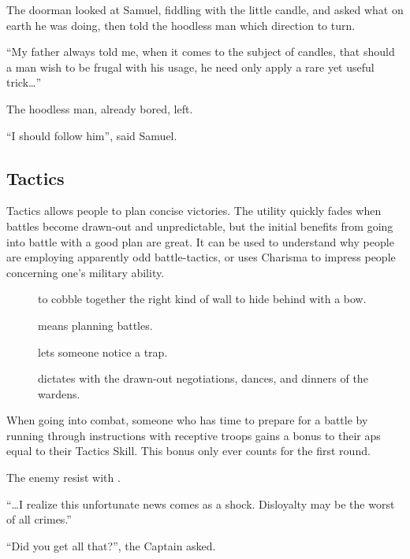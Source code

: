 \begin{multicols}{2}
\begin{exampletext}
  The doorman looked at Samuel, fiddling with the little candle, and asked what on earth he was doing, then told the hoodless man which direction to turn.

  ``My father always told me, when it comes to the subject of candles, that should  a man wish to be frugal with his usage, he need only apply a rare yet useful trick\ldots''

  The hoodless man, already bored, left.

  ``I should follow him'', said Samuel.
\end{exampletext}

\subsection{Tactics}

Tactics allows people to plan concise victories.
The utility quickly fades when battles become drawn-out and unpredictable, but the initial benefits from going into battle with a good plan are great.
It can be used to understand why people are employing apparently odd battle-tactics, or uses Charisma to impress people concerning one's military ability.

\begin{description}
  \item[]
    to cobble together the right kind of wall to hide behind with a bow.
  \item[]
    means planning battles.
  \item[]
    lets someone notice a trap.
  \item[]
    dictates with the drawn-out negotiations, dances, and dinners of the wardens.
\end{description}

When going into combat, someone who has time to prepare for a battle by running through instructions with receptive troops gains a bonus to their \glspl{ap} equal to their Tactics Skill.
This bonus only ever counts for the first \gls{round}.

The enemy resist with .

\begin{exampletext}

  ``\ldots I realize this unfortunate news comes as a shock.
  Disloyalty may be the worst of all crimes.''

  ``Did you get all that?'', the Captain asked.


\end{exampletext}
\end{multicols}
